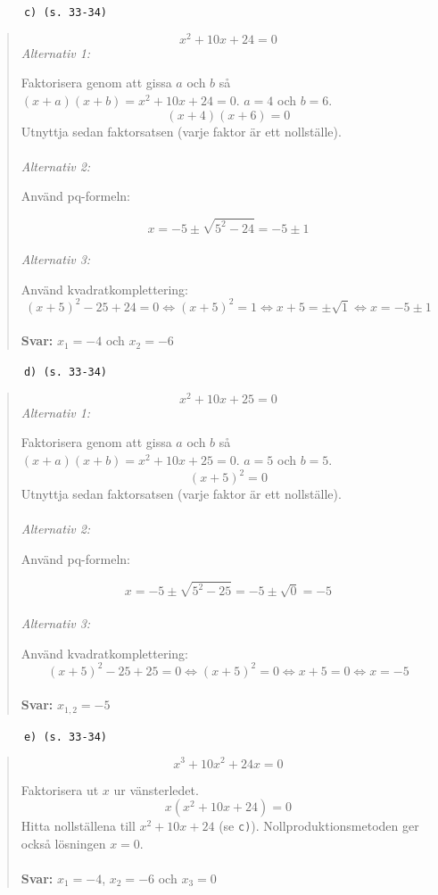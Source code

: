 \documentclass[a4paper]{article}
\newcommand{\tskcol}[1]{\textcolor{tskcol}{#1}}
\begin{document}
	\texttt{\tskcol{~~~~~~c) (s. 33-34)}}
	\begin{quotation}
		\noindent
		\[x^2+10x+24=0\] 
		\emph{Alternativ 1:}
		
		Faktorisera genom att gissa $a$ och $b$ så $(x+a)(x+b)=x^2+10x+24=0$. $a = 4$ och $b = 6$. 
		\[(x+4)(x+6)=0\]
		Utnyttja sedan faktorsatsen (varje faktor är ett nollställe). 
		\\ \\
		\emph{Alternativ 2:}
		
		Använd pq-formeln:
		
		\[x=-5\pm\sqrt{5^2-24}=-5\pm 1\]
		\\
		\emph{Alternativ 3:}
		
		Använd kvadratkomplettering:
		\[(x+5)^2-25+24=0 \Leftrightarrow (x+5)^2=1 \Leftrightarrow x+5=\pm \sqrt{1} \Leftrightarrow x=-5\pm 1\]
		\\
		\textbf{Svar:} $x_1=-4$ och $x_2=-6$
	\end{quotation}
	
	\pagebreak
	\texttt{\tskcol{~~~~~~d) (s. 33-34)}}
	\begin{quotation}
		\noindent
		\[x^2+10x+25=0\] 
		\emph{Alternativ 1:}
		
		Faktorisera genom att gissa $a$ och $b$ så $(x+a)(x+b)=x^2+10x+25=0$. $a = 5$ och $b = 5$. 
		\[(x+5)^2=0\]
		Utnyttja sedan faktorsatsen (varje faktor är ett nollställe). 
		\\ \\
		\emph{Alternativ 2:}
		
		Använd pq-formeln:
		
		\[x=-5\pm\sqrt{5^2-25}=-5\pm \sqrt{0}=-5\]
		\\
		\emph{Alternativ 3:}
		
		Använd kvadratkomplettering:
		\[(x+5)^2-25+25=0 \Leftrightarrow (x+5)^2=0 \Leftrightarrow x+5=0 \Leftrightarrow x=-5\]
		\\
		\textbf{Svar:} $x_{1,2}=-5$
	\end{quotation}
	
	
	\texttt{\tskcol{~~~~~~e) (s. 33-34)}}
	\begin{quotation}
		\noindent
		\[x^3+10x^2+24x=0\] 
		
		Faktorisera ut $x$ ur vänsterledet. 
		\[x(x^2+10x+24)=0\]
		Hitta nollställena till $x^2+10x+24$ (se \texttt{\tskcol{c)}}). Nollproduktionsmetoden ger också lösningen $x=0$.
		\\ \\
		\textbf{Svar:} $x_1=-4$, $x_2=-6$ och $x_3=0$
	\end{quotation}
	
\end{document}
